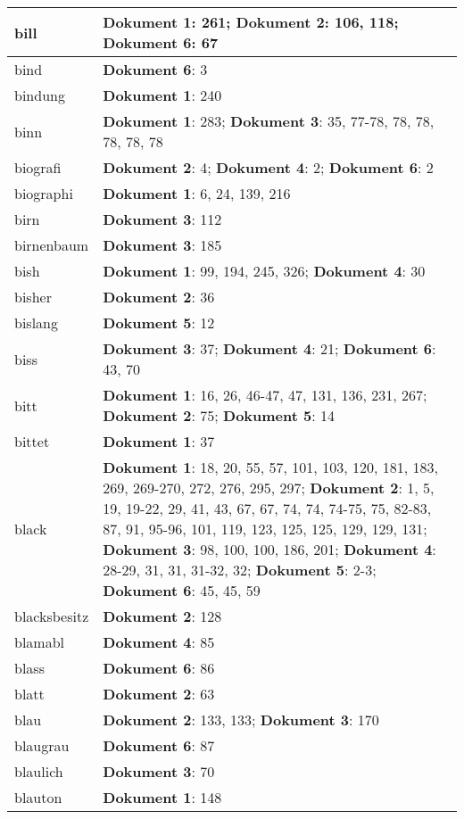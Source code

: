 \documentclass[a5paper]{article}
\begin{document}
\begin{longtable}[l]{|l|p{3in}|}
\hline
bill & \textbf{Dokument 1}: 261; \textbf{Dokument 2}: 106, 118; \textbf{Dokument 6}: 67 \\
\hline
bind & \textbf{Dokument 6}: 3 \\
\hline
bindung & \textbf{Dokument 1}: 240 \\
\hline
binn & \textbf{Dokument 1}: 283; \textbf{Dokument 3}: 35, 77-78, 78, 78, 78, 78, 78 \\
\hline
biografi & \textbf{Dokument 2}: 4; \textbf{Dokument 4}: 2; \textbf{Dokument 6}: 2 \\
\hline
biographi & \textbf{Dokument 1}: 6, 24, 139, 216 \\
\hline
birn & \textbf{Dokument 3}: 112 \\
\hline
birnenbaum & \textbf{Dokument 3}: 185 \\
\hline
bish & \textbf{Dokument 1}: 99, 194, 245, 326; \textbf{Dokument 4}: 30 \\
\hline
bisher & \textbf{Dokument 2}: 36 \\
\hline
bislang & \textbf{Dokument 5}: 12 \\
\hline
biss & \textbf{Dokument 3}: 37; \textbf{Dokument 4}: 21; \textbf{Dokument 6}: 43, 70 \\
\hline
bitt & \textbf{Dokument 1}: 16, 26, 46-47, 47, 131, 136, 231, 267; \textbf{Dokument 2}: 75; \textbf{Dokument 5}: 14 \\
\hline
bittet & \textbf{Dokument 1}: 37 \\
\hline
black & \textbf{Dokument 1}: 18, 20, 55, 57, 101, 103, 120, 181, 183, 269, 269-270, 272, 276, 295, 297; \textbf{Dokument 2}: 1, 5, 19, 19-22, 29, 41, 43, 67, 67, 74, 74, 74-75, 75, 82-83, 87, 91, 95-96, 101, 119, 123, 125, 125, 129, 129, 131; \textbf{Dokument 3}: 98, 100, 100, 186, 201; \textbf{Dokument 4}: 28-29, 31, 31, 31-32, 32; \textbf{Dokument 5}: 2-3; \textbf{Dokument 6}: 45, 45, 59 \\
\hline
blacksbesitz & \textbf{Dokument 2}: 128 \\
\hline
blamabl & \textbf{Dokument 4}: 85 \\
\hline
blass & \textbf{Dokument 6}: 86 \\
\hline
blatt & \textbf{Dokument 2}: 63 \\
\hline
blau & \textbf{Dokument 2}: 133, 133; \textbf{Dokument 3}: 170 \\
\hline
blaugrau & \textbf{Dokument 6}: 87 \\
\hline
blaulich & \textbf{Dokument 3}: 70 \\
\hline
blauton & \textbf{Dokument 1}: 148 \\

\end{longtable}
\end{document}
